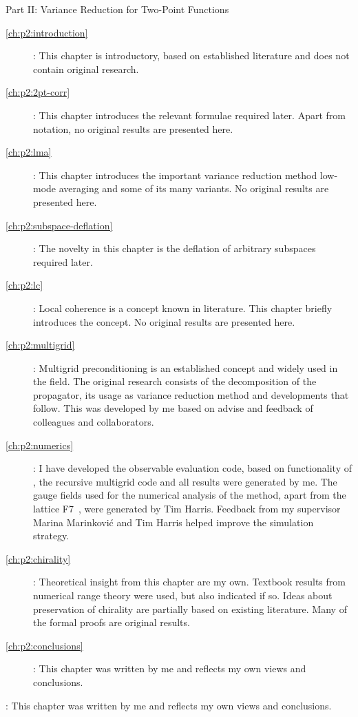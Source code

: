 \begin{description}
\item Part II: Variance Reduction for Two-Point Functions
   \begin{description}
   \item[\cref{ch:p2:introduction}]: This chapter is introductory, based on established literature and does not contain original research.
   \item[\cref{ch:p2:2pt-corr}]: This chapter introduces the relevant formulae required later. Apart from notation, no original results are presented here.
   \item[\cref{ch:p2:lma}]: This chapter introduces the important variance reduction method low-mode averaging and some of its many variants. No original results are presented here.
   \item[\cref{ch:p2:subspace-deflation}]: The novelty in this chapter is the deflation of arbitrary subspaces required later.
   \item[\cref{ch:p2:lc}]: Local coherence is a concept known in literature. This chapter briefly introduces the concept. No original results are presented here.
   \item[\cref{ch:p2:multigrid}]: Multigrid preconditioning is an established concept and widely used in the field. The original research consists of the decomposition of the propagator, its usage as variance reduction method and developments that follow. This was developed by me based on advise and feedback of colleagues and collaborators.
   \item[\cref{ch:p2:numerics}]: I have developed the observable evaluation code, based on functionality of \openqxd, the recursive multigrid code and all results were generated by me. The gauge fields used for the numerical analysis of the method, apart from the lattice F7~\cite{online:cls}, were generated by Tim Harris. Feedback from my supervisor Marina Marinković and Tim Harris helped improve the simulation strategy.
   \item[\cref{ch:p2:chirality}]: Theoretical insight from this chapter are my own. Textbook results from numerical range theory were used, but also indicated if so. Ideas about preservation of chirality are partially based on existing literature. Many of the formal proofs are original results.
   \item[\cref{ch:p2:conclusions}]: This chapter was written by me and reflects my own views and conclusions.
   \end{description}
\item[\cref{ch:summary}]: This chapter was written by me and reflects my own views and conclusions.
\end{description}


